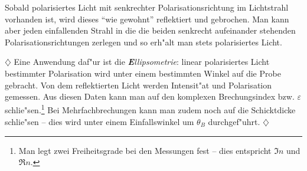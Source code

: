 \documentclass[twoside,a4paper]{book}
\newcommand{\st}[1]{{\slshape \textbf #1}}
\newenvironment*{Beispiel}[0]{$\diamondsuit$\sffamily}{ \hfill $\diamondsuit$}
\begin{document}
Sobald polarisiertes Licht mit senkrechter Polarisationsrichtung im
Lichtstrahl vorhanden ist, wird dieses "`wie gewohnt"' reflektiert und
gebrochen.
Man kann aber jeden einfallenden Strahl in die die beiden senkrecht
aufeinander stehenden Polarisationsrichtungen zerlegen und so erh"alt
man stets polarisiertes Licht.


\begin{Beispiel}
   Eine Anwendung daf"ur ist die \st{Ellipsometrie}: linear polarisiertes
   Licht bestimmter Polarisation wird unter einem bestimmten Winkel
   auf die Probe gebracht. Von dem reflektierten Licht werden
   Intensit"at und Polarisation gemessen. Aus diesen Daten kann man
   auf den komplexen Brechungsindex bzw. $\varepsilon$
   schlie"sen.\footnote{Man legt zwei Freiheitsgrade bei den Messungen
   fest -- dies entspricht $\Im n$ und $\Re n$.} Bei
 Mehrfachbrechungen kann man zudem noch auf die Schicktdicke
 schlie"sen -- dies wird unter einem Einfallswinkel um $\theta_B$ durchgef"uhrt.
\end{Beispiel}





























\newcommand{\orgtheindex}{}
\let\orgtheindex\theindex
\let\orgendtheindex\endtheindex
\def\theindex{%
\def\twocolumn{\begin{multicols}{2}}%
\def\onecolumn{}%
\cleardoublepage
\orgtheindex
}
\def\endtheindex{%
\end{multicols}%
\orgendtheindex
\cleardoublepage
}



\printindex 


\listoffigures
\end{document}
